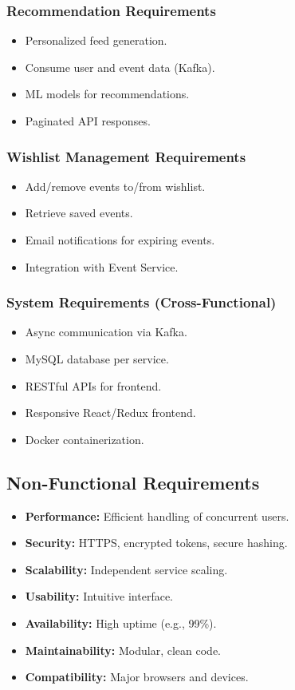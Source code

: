 \documentclass[12pt, a4paper]{report}
\begin{document}
\subsubsection{Recommendation Requirements}
\begin{itemize}
    \item Personalized feed generation.
    \item Consume user and event data (Kafka).
    \item ML models for recommendations.
    \item Paginated API responses.
\end{itemize}

\subsubsection{Wishlist Management Requirements}
\begin{itemize}
    \item Add/remove events to/from wishlist.
    \item Retrieve saved events.
    \item Email notifications for expiring events.
    \item Integration with Event Service.
\end{itemize}

\subsubsection{System Requirements (Cross-Functional)}
\begin{itemize}
    \item Async communication via Kafka.
    \item MySQL database per service.
    \item RESTful APIs for frontend.
    \item Responsive React/Redux frontend.
    \item Docker containerization.
\end{itemize}

\subsection{Non-Functional Requirements}
\begin{itemize}
    \item \textbf{Performance:} Efficient handling of concurrent users.
    \item \textbf{Security:} HTTPS, encrypted tokens, secure hashing.
    \item \textbf{Scalability:} Independent service scaling.
    \item \textbf{Usability:} Intuitive interface.
    \item \textbf{Availability:} High uptime (e.g., 99\%).
    \item \textbf{Maintainability:} Modular, clean code.
    \item \textbf{Compatibility:} Major browsers and devices.
\end{itemize}
\end{document}
